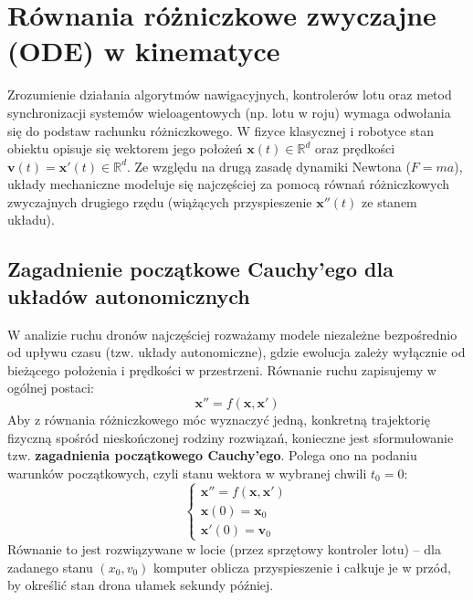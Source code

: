 \section{Równania różniczkowe zwyczajne (ODE) w kinematyce}

Zrozumienie działania algorytmów nawigacyjnych, kontrolerów lotu oraz metod synchronizacji systemów wieloagentowych (np. lotu w roju) wymaga odwołania się do podstaw rachunku różniczkowego. W fizyce klasycznej i robotyce stan obiektu opisuje się wektorem jego położeń $\mathbf{x}(t) \in \mathbb{R}^d$ oraz prędkości $\mathbf{v}(t) = \mathbf{x}'(t) \in \mathbb{R}^d$. Ze względu na drugą zasadę dynamiki Newtona ($F = ma$), układy mechaniczne modeluje się najczęściej za pomocą równań różniczkowych zwyczajnych drugiego rzędu (wiążących przyspieszenie $\mathbf{x}''(t)$ ze stanem układu).

\subsection{Zagadnienie początkowe Cauchy'ego dla układów autonomicznych}

W analizie ruchu dronów najczęściej rozważamy modele niezależne bezpośrednio od upływu czasu (tzw. układy autonomiczne), gdzie ewolucja zależy wyłącznie od bieżącego położenia i prędkości w przestrzeni. Równanie ruchu zapisujemy w ogólnej postaci:
\begin{equation}
    \mathbf{x}'' = f(\mathbf{x}, \mathbf{x}')
\end{equation}
Aby z równania różniczkowego móc wyznaczyć jedną, konkretną trajektorię fizyczną spośród nieskończonej rodziny rozwiązań, konieczne jest sformułowanie tzw. \textbf{zagadnienia początkowego Cauchy'ego}. Polega ono na podaniu warunków początkowych, czyli stanu wektora w wybranej chwili $t_0 = 0$:
\begin{equation}
    \begin{cases}
        \mathbf{x}'' = f(\mathbf{x}, \mathbf{x}') \\
        \mathbf{x}(0) = \mathbf{x}_0 \\
        \mathbf{x}'(0) = \mathbf{v}_0
    \end{cases}
    \label{eq:cauchy_ivp}
\end{equation}
Równanie to jest rozwiązywane w locie (przez sprzętowy kontroler lotu) – dla zadanego stanu $(x_0, v_0)$ komputer oblicza przyspieszenie i całkuje je w przód, by określić stan drona ułamek sekundy później.

